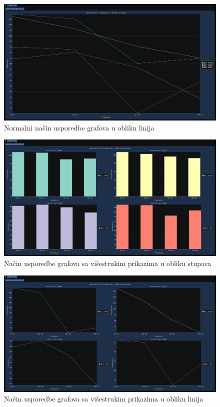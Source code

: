 \documentclass[times, utf8, diplomski]{fer}
\begin{document}
\begin{figure}[H]
	\centering
	\includegraphics[width=\textwidth]{default_graph_display_lines.png}
	\caption{Normalni način usporedbe grafova u obliku linija}
    \label{appendix:default_graph_display_lines}
\end{figure}

\begin{figure}[H]
	\centering
	\includegraphics[width=\textwidth]{subplots_graph_display_bars.png}
	\caption{Način usporedbe grafova sa višestrukim prikazima u obliku stupaca}
    \label{appendix:subplots_graph_display_bars}
\end{figure}

\begin{figure}[H]
	\centering
	\includegraphics[width=\textwidth]{subplots_graph_display_lines.png}
	\caption{Način usporedbe grafova sa višestrukim prikazima u obliku linija}
    \label{appendix:subplots_graph_display_lines}
\end{figure}
\end{document}
